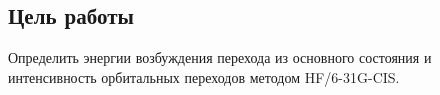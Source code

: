 \subsection{Цель работы}
Определить энергии возбуждения перехода из основного состояния и интенсивность орбитальных переходов методом HF/6-31G-CIS.

